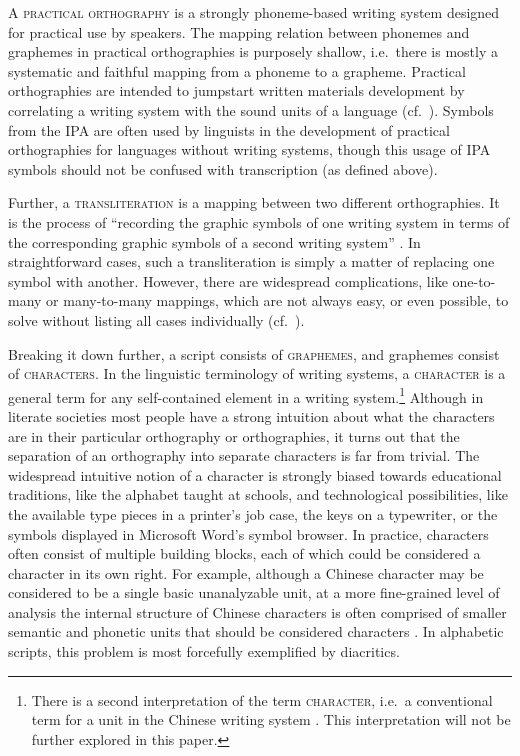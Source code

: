 A \textsc{practical orthography} is a strongly phoneme-based writing system
designed for practical use by speakers. The mapping relation between phonemes
and graphemes in practical orthographies is purposely shallow, i.e.~there is
mostly a systematic and faithful mapping from a phoneme to a grapheme. Practical
orthographies are intended to jumpstart written materials development by
correlating a writing system with the sound units of a language
(cf.~\citet{MeinhofJones1928}). Symbols from the IPA are often used by linguists
in the development of practical orthographies for languages without writing
systems, though this usage of IPA symbols should not be confused with
transcription (as defined above).

Further, a \textsc{transliteration} is a mapping between two different
orthographies. It is the process of ``recording the graphic symbols of one
writing system in terms of the corresponding graphic symbols of a second writing
system'' \citep[396]{Kemp2006}. In straightforward cases, such a transliteration
is simply a matter of replacing one symbol with another. However, there are
widespread complications, like one-to-many or many-to-many mappings, which are
not always easy, or even possible, to solve without listing all cases
individually (cf.~\citet[chp 2]{Moran2012}).

Breaking it down further, a script consists of \textsc{graphemes}, and graphemes
consist of \textsc{characters}. In the linguistic terminology of writing
systems, a \textsc{character} is a general term for any self-contained element
in a writing system.\footnote{There is a second interpretation of the term
\textsc{character}, i.e.~a conventional term for a unit in the Chinese writing
system \citep{Daniels1996}. This interpretation will not be further explored in
this paper.} Although in literate societies most people have a strong intuition
about what the characters are in their particular orthography or orthographies,
it turns out that the separation of an orthography into separate characters is
far from trivial. The widespread intuitive notion of a character is strongly
biased towards educational traditions, like the alphabet taught at schools, and
technological possibilities, like the available type pieces in a printer's job
case, the keys on a typewriter, or the symbols displayed in Microsoft Word's
symbol browser. In practice, characters often consist of multiple building
blocks, each of which could be considered a character in its own right. For
example, although a Chinese character may be considered to be a single basic
unanalyzable unit, at a more fine-grained level of analysis the internal
structure of Chinese characters is often comprised of smaller semantic and
phonetic units that should be considered characters \citep{Sproat2000}. In
alphabetic scripts, this problem is most forcefully exemplified by diacritics.

